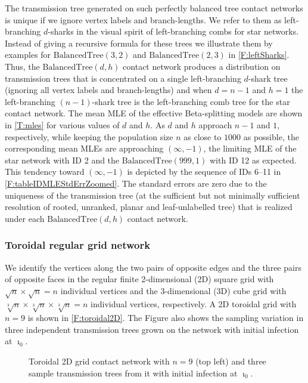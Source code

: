 \documentclass[review]{elsarticle}
\numberwithin{equation}{section}
\let\orgautoref\autoref
\renewcommand{\autoref}
        {\def\equationautorefname{Eq.}%
         \def\figureautorefname{Fig.}%
         \def\subfigureautorefname{Fig.}%
         \def\sectionautorefname{Sect.}%
         \def\subsectionautorefname{Sect.}%
         \def\subsubsectionautorefname{Sect.}%
         \def\Itemautorefname{item}%
         \def\tableautorefname{Table}%
         \def\propositionautorefname{Prop.}%
         \def\corollaryautorefname{Corollary}%
         \def\theoremautorefname{Theorem}%
         \def\remarkautorefname{Remark}%
         \def\lemmaautorefname{Lemma}%
         \def\proofofautorefname{Proof}%
         \def\exampleautorefname{Example}%
         \orgautoref}
\begin{document}
The transmission tree generated on such perfectly balanced tree contact networks is unique if we ignore vertex labels and branch-lengths. 
We refer to them as left-branching $d$-sharks in the visual spirit of left-branching combs for star networks. 
Instead of giving a recursive formula for these trees we illustrate them by examples for $\mathrm{BalancedTree}(3,2)$ and $\mathrm{BalancedTree}(2,3)$ in \autoref{F:leftSharks}.
Thus, the $\mathrm{BalancedTree}(d,h)$ contact network produces a distribution on transmission trees that is concentrated on a single left-branching $d$-shark tree (ignoring all vertex labels and branch-lengths) and when $d=n-1$ and $h=1$ the left-branching $(n-1)$-shark tree is the left-branching comb tree for the star contact network.
The mean MLE of the effective Beta-splitting models are shown in \autoref{T:mles} for various values of $d$ and $h$.  
As $d$ and $h$ approach $n-1$ and $1$, respectively, while keeping the population size $n$ as close to $1000$ as possible, the corresponding mean MLEs are approaching $(\infty,-1)$, the limiting MLE of the star network with ID 2 and the $\mathrm{BalancedTree}(999,1)$ with ID 12 as expected.  
This tendency toward $(\infty,-1)$ is depicted by the sequence of IDs 6--11 in \autoref{F:tableIDMLEStdErrZoomed}.  
The standard errors are zero due to the uniqueness of the transmission tree (at the sufficient but not minimally sufficient resolution of rooted, unranked, planar and leaf-unlabelled tree) that is realized under each $\mathrm{BalancedTree}(d,h)$ contact network.
 
\subsubsection{Toroidal regular grid network}

We identify the vertices along the two pairs of opposite edges and the three pairs of opposite faces in the regular finite 2-dimensional (2D) square grid with $\sqrt{n} \times \sqrt{n}=n$ individual vertices and the 3-dimensional (3D) cube grid with $\sqrt[3]{n} \times \sqrt[3]{n} \times \sqrt[3]{n}=n$ individual vertices, respectively.  
A 2D toroidal grid with $n=9$ is shown in \autoref{F:toroidal2D}.  
The Figure also shows the sampling variation in three independent transmission trees grown on the network with initial infection at $\imath_0$.  

\begin{figure}[htbp]
\begin{center}
{\scalebox{0.725}{

}}
\end{center}
\caption{Toroidal 2D grid contact network with $n=9$ (top left) and three sample transmission trees from it with initial infection at $\imath_0$.\label{F:toroidal2D}}
\end{figure}
\end{document}
